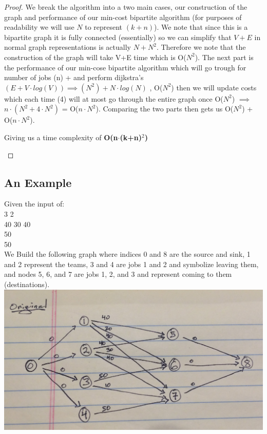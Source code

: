 \documentclass[12pt]{article}
\begin{document}
\begin{proof}
We break the algorithm into a two main cases, our construction of the graph and performance of our min-cost
bipartite algorithm (for purposes of readability we will use $N$ to represent $(k+n)$). We note that since
this is a bipartite graph it is fully connected (essentially) so we can simplify that $V + E$ in normal
graph representations is actually $N + N^2$. Therefore we note that the construction of the graph will
take V+E time which is O($N^2$). The next part is the performance of our min-cose bipartite algorithm which
will go trough for number of jobs (n) + and perform dijkstra's $(E + V\cdot log(V)) \implies (N^2) + N\cdot log(N)$
, O($N^2$) then we will update costs which each time (4) will at most go through the entire graph once O($N^2$)
$\implies$ $n\cdot (N^2 + 4\cdot N^2)$ = O($n \cdot N^2$). Comparing the two parts then gets us O($N^2$) +
O($n \cdot N^2$).
\begin{center}
    Giving us a time complexity of \textbf{O(n$\cdot$(k+n)$^2$)}
\end{center}
\end{proof}


\subsection{An Example}
Given the input of: \\
3 2 \\
40 30 40 \\
50 \\
50 \\

We Build the following graph where indices 0 and 8 are the source and sink, 1 and 2 represent the
teams, 3 and 4 are jobs 1 and 2 and symbolize leaving them, and nodes 5, 6, and 7 are jobs 1, 2, and 3
and represent coming to them (destinations). \\
\includegraphics[width=\textwidth]{ExampleCpart1} \\
\end{document}
